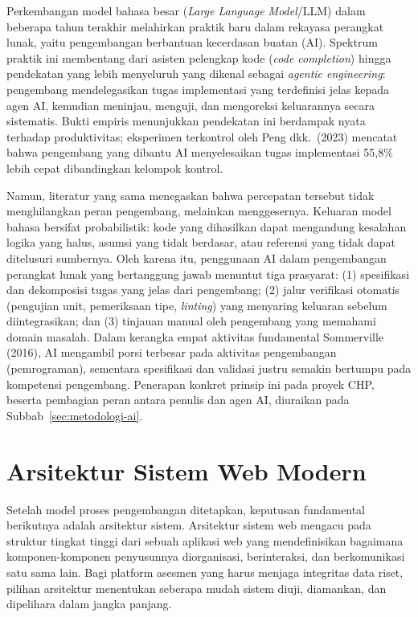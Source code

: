 Perkembangan model bahasa besar (\textit{Large Language Model}/LLM) dalam beberapa tahun terakhir melahirkan praktik baru dalam rekayasa perangkat lunak, yaitu pengembangan berbantuan kecerdasan buatan (AI). Spektrum praktik ini membentang dari asisten pelengkap kode (\textit{code completion}) hingga pendekatan yang lebih menyeluruh yang dikenal sebagai \textit{agentic engineering}: pengembang mendelegasikan tugas implementasi yang terdefinisi jelas kepada agen AI, kemudian meninjau, menguji, dan mengoreksi keluarannya secara sistematis. Bukti empiris menunjukkan pendekatan ini berdampak nyata terhadap produktivitas; eksperimen terkontrol oleh Peng dkk.\ (2023) mencatat bahwa pengembang yang dibantu AI menyelesaikan tugas implementasi 55,8\% lebih cepat dibandingkan kelompok kontrol.

Namun, literatur yang sama menegaskan bahwa percepatan tersebut tidak menghilangkan peran pengembang, melainkan menggesernya. Keluaran model bahasa bersifat probabilistik: kode yang dihasilkan dapat mengandung kesalahan logika yang halus, asumsi yang tidak berdasar, atau referensi yang tidak dapat ditelusuri sumbernya. Oleh karena itu, penggunaan AI dalam pengembangan perangkat lunak yang bertanggung jawab menuntut tiga prasyarat: (1) spesifikasi dan dekomposisi tugas yang jelas dari pengembang; (2) jalur verifikasi otomatis (pengujian unit, pemeriksaan tipe, \textit{linting}) yang menyaring keluaran sebelum diintegrasikan; dan (3) tinjauan manual oleh pengembang yang memahami domain masalah. Dalam kerangka empat aktivitas fundamental Sommerville (2016), AI mengambil porsi terbesar pada aktivitas pengembangan (pemrograman), sementara spesifikasi dan validasi justru semakin bertumpu pada kompetensi pengembang. Penerapan konkret prinsip ini pada proyek CHP, beserta pembagian peran antara penulis dan agen AI, diuraikan pada Subbab~\ref{sec:metodologi-ai}.

\section{Arsitektur Sistem Web Modern}
\label{sec:arsitektur-web}

Setelah model proses pengembangan ditetapkan, keputusan fundamental berikutnya adalah arsitektur sistem. Arsitektur sistem web mengacu pada struktur tingkat tinggi dari sebuah aplikasi web yang mendefinisikan bagaimana komponen-komponen penyusunnya diorganisasi, berinteraksi, dan berkomunikasi satu sama lain. Bagi platform asesmen yang harus menjaga integritas data riset, pilihan arsitektur menentukan seberapa mudah sistem diuji, diamankan, dan dipelihara dalam jangka panjang.


